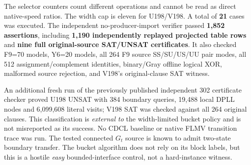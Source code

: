 \documentclass[11pt]{article}
\begin{document}
\begin{center}\small
{}\end{center}

The selector counters count different operations and cannot be read as direct native-speed ratios. The width cap is eleven for U198/V198. A total of \textbf{21} cases was executed. The independent no-producer-import verifier passed \textbf{1,852 assertions}, including \textbf{1,190 independently replayed projected table rows} and \textbf{nine full original-source SAT/UNSAT certificates}. It also checked F9=70 models, Y6=20 models, all 264 F9 source SS/SU/US/UU pair modes, all 512 assignment/complement identities, binary/Gray offline logical XOR, malformed source rejection, and V198's original-clause SAT witness.

An additional fresh run of the previously published independent 302 certificate checker proved U198 UNSAT with 384 boundary queries, 19,488 local DPLL nodes and 6,099,608 literal visits; V198 SAT was checked against all 264 original clauses. This classification is \emph{external to} the width-limited bucket policy and is not misreported as its success. No CDCL baseline or native FLMV transition trace was run. The tested connected $G_t$ source is known to admit two-state boundary transfer. The bucket algorithm does not rely on its block labels, but this is a hostile \emph{easy} bounded-interface control, not a hard-instance witness.
\end{document}
